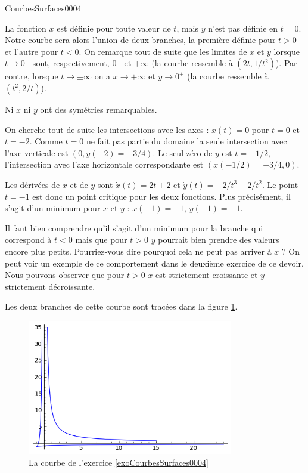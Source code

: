 \begin{corrige}{CourbesSurfaces0004}

La fonction $x$ est définie pour toute valeur de $t$, mais $y$ n'est pas définie en $t=0$. Notre courbe sera alors l'union de deux branches, la première définie pour $t>0$ et l'autre pour $t<0$. On remarque tout de suite que les limites de $x$ et $y$ lorsque $t\to 0^{\pm}$ sont, respectivement, $0^\pm$ et $+\infty$ (la courbe ressemble à $(2t, 1/t^2)$). Par contre, lorsque $t\to \pm\infty$ on a $x\to +\infty$ et $y\to 0^\pm$ (la courbe ressemble à $(t^2, 2/t)$). 

Ni $x$ ni $y$ ont des symétries remarquables. 

On cherche tout de suite les intersections avec les axes : $x(t)=0$ pour $t=0$ et $t=-2$. Comme $t=0$ ne fait pas partie du domaine la seule intersection avec l'axe verticale est $(0, y(-2)=-3/4)$. Le seul zéro de $y$ est $t=-1/2$, l'intersection avec l'axe horizontale correspondante est $(x(-1/2)=-3/4,0)$. 

Les dérivées de $x$ et de $y$ sont $\dot x (t)= 2t+2 $ et $\dot y(t)= -2/t^3-2/t^2$. Le point $t=-1$ est donc un point critique pour les deux fonctions. Plus précisément, il s'agit d'un minimum pour $x$ et $y$ : $x(-1)=-1$, $y(-1)= -1$.

 Il faut bien comprendre qu'il s'agit  d'un minimum pour la branche qui correspond à  $t<0$ mais que pour $t>0$ $y$ pourrait bien prendre des valeurs encore plus petits. Pourriez-vous dire pourquoi cela ne peut pas arriver à $x$ ? On peut voir un exemple de ce comportement dans le deuxième exercice de ce devoir.   
Nous pouvons observer que pour $t>0$ $x$ est strictement croissante et $y$ strictement décroissante. 

Les deux branches de cette courbe sont tracées dans la figure \ref{figdevoir3exo1}.

\begin{figure}
  \begin{center}
    \includegraphics[width=9cm]{pictures_bitmap/figdevoir3exo1.png}

  \caption{La courbe de l'exercice \ref{exoCourbesSurfaces0004}}\label{figdevoir3exo1}
  \end{center}
 \end{figure}
\end{corrige}
